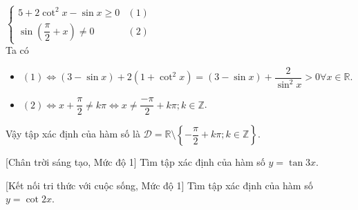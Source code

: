 \begin{ex}
{\begin{enumerate}
			$\left\{\begin{array}{ll}
			5+2\cot^2x-\sin x\ge 0& (1)\\ 
			\sin \left(\dfrac{\pi}{2}+x\right)\ne 0 & (2) 
		\end{array}\right.$\\
		Ta có 
		\begin{itemize}
			\item $(1)\Leftrightarrow (3-\sin  x)+2(1+\cot^2x)=(3-\sin x)+\dfrac{2}{\sin^2x}>0\forall x\in \mathbb{R}$.
			 \item $(2)\Leftrightarrow x+\dfrac{\pi}{2}\ne k\pi \Leftrightarrow x\ne \dfrac{-\pi}{2}+k\pi; k\in \mathbb{Z}$.
		\end{itemize}
		Vậy tập xác định của hàm  số là $\mathscr{D}=\mathbb{R}\setminus \left\{-\dfrac{\pi}{2}+k\pi;k\in \mathbb{Z}\right\}$.
	\end{enumerate}
	} 
\end{ex}

\begin{bt}%
[Chân trời sáng tạo, Mức độ 1]%
	Tìm tập xác định của hàm số $y=\tan 3x$.
\end{bt}

\begin{bt}%
[Kết nối tri thức với cuộc sống, Mức độ 1]%
	Tìm tập xác định của hàm số $y=\cot 2x$.
\end{bt}

